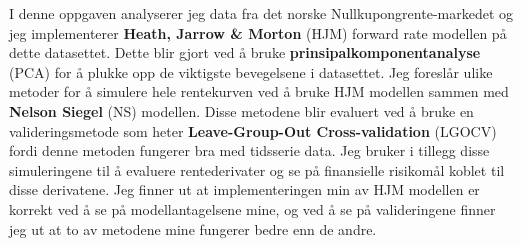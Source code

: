 
\noindent I denne oppgaven analyserer jeg data fra det norske Nullkupongrente-markedet og jeg implementerer \textbf{Heath, Jarrow \& Morton} (HJM) forward rate modellen på dette datasettet. Dette blir gjort ved å bruke \textbf{prinsipalkomponentanalyse} (PCA) for å plukke opp de viktigste bevegelsene i datasettet. Jeg foreslår ulike metoder for å simulere hele rentekurven ved å bruke HJM modellen sammen med \textbf{Nelson Siegel} (NS) modellen. Disse metodene blir evaluert ved å bruke en valideringsmetode som heter \textbf{Leave-Group-Out Cross-validation} (LGOCV) fordi denne metoden fungerer bra med tidsserie data. Jeg bruker i tillegg disse simuleringene til å evaluere rentederivater og se på finansielle risikomål koblet til disse derivatene. Jeg finner ut at implementeringen min av HJM modellen er korrekt ved å se på modellantagelsene mine, og ved å se på valideringene finner jeg ut at to av metodene mine fungerer bedre enn de andre.